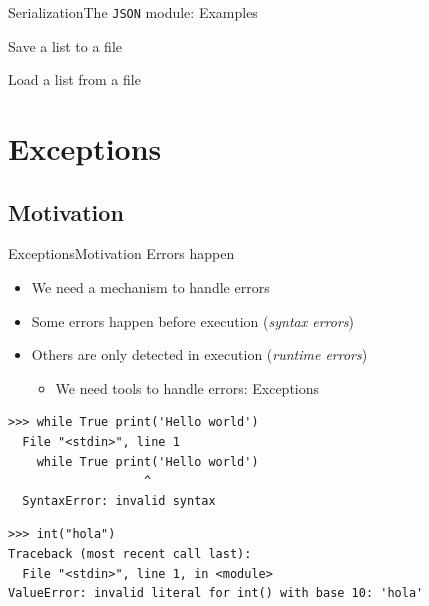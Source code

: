 \documentclass[10pt,compress]{beamer} %
\begin{document}
\begin{frame}[fragile]{Serialization}{The \texttt{JSON} module: Examples}
	\begin{exampleblock}{Save a list to a file}
	\vspace{-0.2cm}
	
	\vspace{-0.2cm}
	\end{exampleblock}

	\begin{exampleblock}{Load a list from a file}
	\vspace{-0.2cm}
	
	\vspace{-0.2cm}
	\end{exampleblock}
\end{frame}

\section{Exceptions}
\subsection{Motivation}

\begin{frame}[fragile]{Exceptions}{Motivation}
	Errors happen
	\begin{itemize}
		\item We need a mechanism to handle errors
	    \item Some errors happen before execution (\textit{syntax errors})

		\item Others are only detected in execution (\textit{runtime errors})
        \begin{itemize}
        \item We need tools to handle errors: \alert{Exceptions}
        \end{itemize}
    \end{itemize}

	\small

\begin{verbatim}
>>> while True print('Hello world')
  File "<stdin>", line 1
    while True print('Hello world')
                   ^
  SyntaxError: invalid syntax
\end{verbatim}

\begin{verbatim}
>>> int("hola")
Traceback (most recent call last):
  File "<stdin>", line 1, in <module>
ValueError: invalid literal for int() with base 10: 'hola'
\end{verbatim}
\end{frame}
\end{document}

